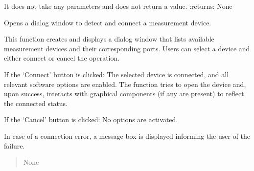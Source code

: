 \documentclass[letterpaper,10pt,english]{sphinxmanual}
\begin{document}
\begin{fulllineitems}
\begin{fulllineitems}
\sphinxAtStartPar
It does not take any parameters and does not return a value.
:returns: None

\end{fulllineitems}


\begin{fulllineitems}
\label{\detokenize{main:main.MainWindow.open_dialog}}
\pysigstartsignatures
{}
\pysigstopsignatures
\sphinxAtStartPar
Opens a dialog window to detect and connect a measurement device.

\sphinxAtStartPar
This function creates and displays a dialog window that lists available measurement devices and their corresponding ports. 
Users can select a device and either connect or cancel the operation.

\sphinxAtStartPar
If the ‘Connect’ button is clicked:
\sphinxhyphen{} The selected device is connected, and all relevant software options are enabled.
\sphinxhyphen{} The function tries to open the device and, upon success, interacts with graphical components (if any are present) to reflect the connected status.

\sphinxAtStartPar
If the ‘Cancel’ button is clicked:
\sphinxhyphen{} No options are activated.

\sphinxAtStartPar
In case of a connection error, a message box is displayed informing the user of the failure.
\begin{quote}\begin{description}
\sphinxAtStartPar
None

\end{description}\end{quote}

\end{fulllineitems}


\begin{fulllineitems}
\label{\detokenize{main:main.MainWindow.parameters_action}}
\pysigstartsignatures
{}
\pysigstopsignatures
\end{fulllineitems}



\end{fulllineitems}
\end{document}
